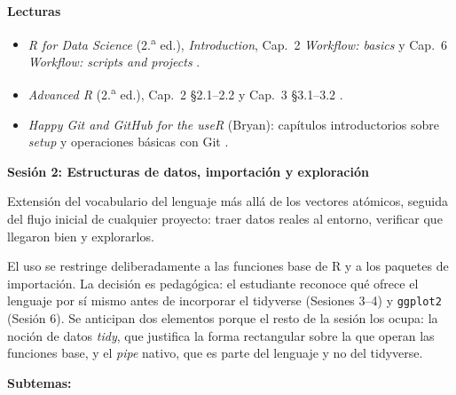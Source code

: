 \documentclass[11pt,letterpaper]{article}
\newcommand{\sesion}[2]{%
  \bigskip%
  {\color{main}\Large\bfseries Sesión #1: #2\par}%
  \smallskip%
}
\begin{document}
\medskip
\noindent\textbf{Lecturas}
\begin{itemize}[leftmargin=*, itemsep=1pt]
    \item \textit{R for Data Science} (2.\textsuperscript{a} ed.), \textit{Introduction}, Cap.\ 2 \textit{Workflow: basics} y Cap.\ 6 \textit{Workflow: scripts and projects} \cite{wickham2023r4ds}.
    \item \textit{Advanced R} (2.\textsuperscript{a} ed.), Cap.\ 2 §2.1--2.2 y Cap.\ 3 §3.1--3.2 \cite{wickham2019advr}.
    \item \textit{Happy Git and GitHub for the useR} (Bryan): capítulos introductorios sobre \textit{setup} y operaciones básicas con Git \cite{bryan-happygit}.
\end{itemize}

\sesion{2}{Estructuras de datos, importación y exploración}

Extensión del vocabulario del lenguaje más allá de los vectores atómicos, seguida del flujo inicial de cualquier proyecto: traer datos reales al entorno, verificar que llegaron bien y explorarlos.

El uso se restringe deliberadamente a las funciones base de R y a los paquetes de importación. La decisión es pedagógica: el estudiante reconoce qué ofrece el lenguaje por sí mismo antes de incorporar el tidyverse (Sesiones 3--4) y \texttt{ggplot2} (Sesión 6). Se anticipan dos elementos porque el resto de la sesión los ocupa: la noción de datos \textit{tidy}, que justifica la forma rectangular sobre la que operan las funciones base, y el \textit{pipe} nativo, que es parte del lenguaje y no del tidyverse.

\textbf{Subtemas:}
\end{document}
